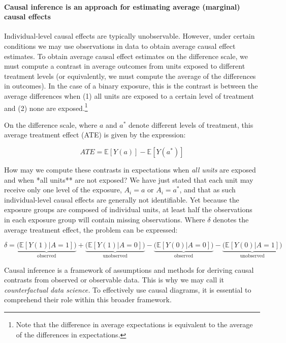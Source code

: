 \documentclass[
  singlecolumn]{article}
\let\oldparagraph\paragraph
\renewcommand{\paragraph}[1]{\oldparagraph{#1}\mbox{}}
\begin{document}
\hypertarget{causal-inference-is-an-approach-for-estimating-average-marginal-causal-effects}{%
\paragraph{Causal inference is an approach for estimating average
(marginal) causal
effects}\label{causal-inference-is-an-approach-for-estimating-average-marginal-causal-effects}}

Individual-level causal effects are typically unobservable. However,
under certain conditions we may use observations in data to obtain
average causal effect estimates. To obtain average causal effect
estimates on the difference scale, we must compute a contrast in average
outcomes from units exposed to different treatment levels (or
equivalently, we must compute the average of the differences in
outcomes). In the case of a binary exposure, this is the contrast is
between the average differences when (1) all units are exposed to a
certain level of treatment and (2) none are exposed.\footnote{Note that
  the difference in average expectations is equivalent to the average of
  the differences in expectations.}

On the difference scale, where \(a\) and \(a^*\) denote different levels
of treatment, this average treatment effect (ATE) is given by the
expression:

\[
ATE = \mathbb{E}[Y(a)] - \mathbb{E}[Y(a^*)]
\]

How may we compute these contrasts in expectations when \emph{all units}
are exposed and when *all units** are not exposed? We have just stated
that each unit may receive only one level of the exposure, \(A_i = a\)
or \(A_i = a^*\), and that as such individual-level causal effects are
generally not identifiable. Yet because the exposure groups are composed
of individual units, at least half the observations in each exposure
group will contain missing observations. Where \(\delta\) denotes the
average treatment effect, the problem can be expressed:

\[
\delta = \underbrace{\big(\mathbb{E}[Y(1)|A = 1]\big)}_{\text{observed}} + \underbrace{\big(\mathbb{E}[Y(1)|A = 0]\big)}_{\text{unobserved}} - \underbrace{\big(\mathbb{E}[Y(0)|A = 0]\big)}_{\text{observed}}  - \underbrace{\big(\mathbb{E}[Y(0)|A = 1]\big)}_{\text{unobserved}}
\]

Causal inference is a framework of assumptions and methods for deriving
causal contrasts from observed or observable data. This is why we may
call it \emph{counterfactual data science.} To effectively use causal
diagrams, it is essential to comprehend their role within this broader
framework.
\end{document}
